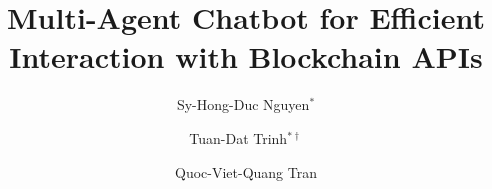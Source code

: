 \documentclass[runningheads]{llncs}
\begin{document}
%
\title{Multi-Agent Chatbot for Efficient Interaction with Blockchain APIs}
%
%

\author{Sy-Hong-Duc Nguyen$^*$ \and
Tuan-Dat Trinh$^{*\dagger}$ \and
Quoc-Viet-Quang Tran}

\def\thefootnote{*}
\def\thefootnote{$\dagger$}
\def\thefootnote{\arabic{footnote}}
\end{document}
